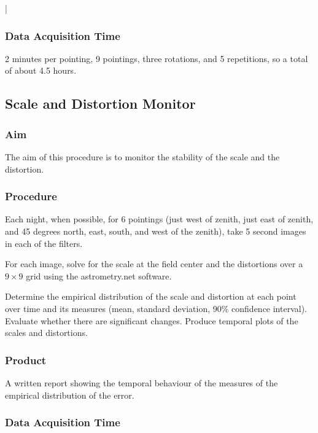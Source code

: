 |\documentclass{article}
\begin{document}
\subsubsection{Data Acquisition Time}

2 minutes per pointing, 9 pointings, three rotations, and 5 repetitions, so a total of about 4.5 hours.


\subsection{Scale and Distortion Monitor}

\subsubsection{Aim}

The aim of this procedure is to monitor the stability of the scale and the distortion.

\subsubsection{Procedure}

Each night, when possible, for 6 pointings (just west of zenith, just east of zenith, and 45 degrees north, east, south, and west of the zenith), take 5 second images in each of the filters.

For each image, solve for the scale at the field center and the distortions over a $9\times9$ grid using the astrometry.net software.

Determine the empirical distribution of the scale and distortion at each point over time and its measures (mean, standard deviation, 90\% confidence interval). Evaluate whether there are significant changes. Produce temporal plots of the scales and distortions.

\subsubsection{Product}

A written report showing the temporal behaviour of the measures of the empirical distribution of the error. 

\subsubsection{Data Acquisition Time}
\end{document}
